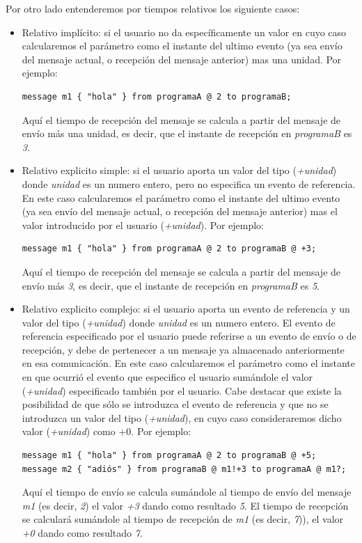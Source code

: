 \documentclass[12pt,a4paper]{report}
\begin{document}
Por otro lado entenderemos por tiempos relativos los siguiente casos:

\begin{itemize}
\item Relativo implícito: si el usuario no da específicamente un valor en cuyo caso calcularemos el parámetro como el instante del ultimo evento (ya sea envío del mensaje actual, o recepción del mensaje anterior) mas una unidad. Por ejemplo:
\begin{verbatim}
message m1 { "hola" } from programaA @ 2 to programaB;
\end{verbatim}
Aquí el tiempo de recepción del mensaje se calcula a partir del mensaje de envío más una unidad, es decir, que el instante de recepción en \textit{programaB} es \textit{3}.
\item Relativo explicito simple: si el usuario aporta un valor del tipo (\textit{+unidad}) donde \textit{unidad} es un numero entero, pero no especifica un evento de referencia. En este caso calcularemos el parámetro como el instante del ultimo evento (ya sea envío del mensaje actual, o recepción del mensaje anterior) mas el valor introducido por el usuario (\textit{+unidad}). Por ejemplo:
\begin{verbatim}
message m1 { "hola" } from programaA @ 2 to programaB @ +3;
\end{verbatim}
Aquí el tiempo de recepción del mensaje se calcula a partir del mensaje de envío más \textit{3}, es decir, que el instante de recepción en \textit{programaB} es \textit{5}.
\item Relativo explicito complejo: si el usuario aporta un evento de referencia y un valor del tipo (\textit{+unidad}) donde \textit{unidad} es un numero entero. El evento de referencia especificado por el usuario puede referirse a un evento de envío o de recepción, y debe de pertenecer a un mensaje ya almacenado anteriormente en esa comunicación. En este caso calcularemos el parámetro como el instante en que ocurrió el evento que especifico el usuario sumándole el valor (\textit{+unidad}) especificado también por el usuario. Cabe destacar que existe la posibilidad de que sólo se introduzca el evento de referencia y que no se introduzca un valor del tipo (\textit{+unidad}), en cuyo caso consideraremos dicho valor (\textit{+unidad}) como +0. Por ejemplo:
\begin{verbatim}
message m1 { "hola" } from programaA @ 2 to programaB @ +5;
message m2 { "adiós" } from programaB @ m1!+3 to programaA @ m1?;
\end{verbatim}
Aquí el tiempo de envío se calcula sumándole al tiempo de envío del mensaje \textit{m1} (es decir, \textit{2}) el valor \textit{+3} dando como resultado \textit{5}. El tiempo de recepción se calculará sumándole al tiempo de recepción de \textit{m1} (es decir, \textit{7})), el valor \textit{+0} dando como resultado \textit{7}.
\end{itemize}
\end{document}
